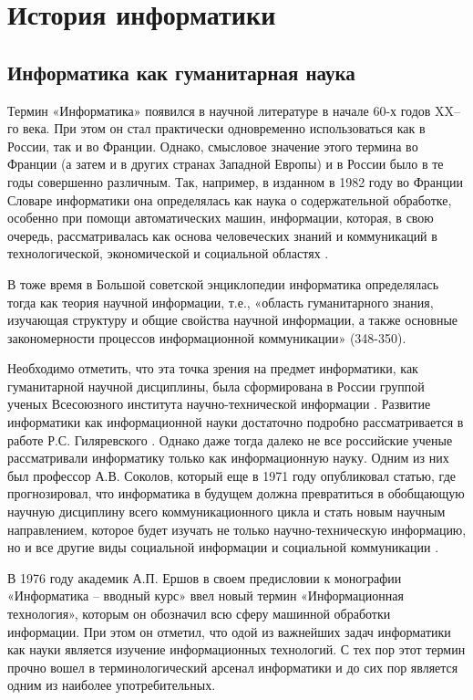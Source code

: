 \section{История информатики} \label{sect1_2}

\subsection{Информатика как гуманитарная наука} \label{subsect1_2_1}

Термин «Информатика» появился в научной литературе в начале 60-х годов XX–го века. При этом он стал практически одновременно использоваться как в России, так и во Франции. Однако, смысловое значение этого термина во Франции (а затем и в других странах Западной Европы) и в России было в те годы совершенно различным. Так, например, в изданном в 1982 году во Франции Словаре информатики она определялась как наука о содержательной обработке, особенно при помощи автоматических машин, информации, которая, в свою очередь, рассматривалась как основа человеческих знаний и коммуникаций в технологической, экономической и социальной областях \cite{bib202}.

В тоже время в Большой советской энциклопедии информатика определялась тогда как теория научной информации, т.е., «область гуманитарного знания, изучающая структуру и общие свойства научной информации, а также основные закономерности процессов информационной коммуникации» \cite{bib203}(348-350). 

Необходимо отметить, что эта точка зрения на предмет информатики, как гуманитарной научной дисциплины, была сформирована в России группой ученых Всесоюзного института научно-технической информации \cite{bib204,bib205}. Развитие информатики как информационной науки достаточно подробно рассматривается в работе Р.С. Гиляревского \cite{bib206}.  Однако даже тогда далеко не все российские ученые рассматривали информатику только как информационную науку. Одним из них был профессор А.В. Соколов, который еще в 1971 году опубликовал статью, где прогнозировал, что информатика в будущем должна превратиться в обобщающую научную дисциплину всего коммуникационного цикла  и стать новым научным направлением, которое будет изучать не только научно-техническую информацию, но и все другие виды социальной информации и социальной коммуникации \cite{bib207}.

       В 1976 году академик А.П. Ершов в своем предисловии к монографии «Информатика – вводный курс» ввел новый термин «Информационная технология», которым он обозначил всю сферу машинной обработки информации. При этом он отметил, что одой из важнейших задач информатики как науки является изучение информационных технологий. С тех пор этот термин прочно вошел в терминологический арсенал информатики и до сих пор является одним из наиболее употребительных.

